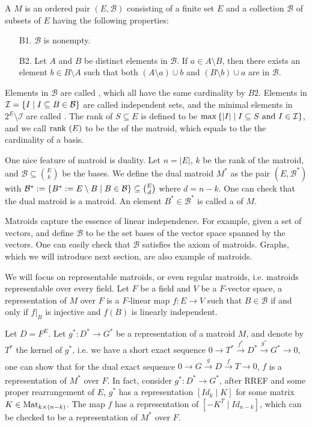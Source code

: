 \documentclass[b5paper]{article}
\newcommand{\II}{\mathcal{I}}
\newcommand{\BB}{\mathcal{B}}
\newcommand{\del}{\setminus}
\begin{document}
\begin{definition}[def:]{}
  A  $M$ is an ordered pair $(E,\BB)$ consisting of a finite set $E$ and a collection $\BB$ of subsets of $E$ having the following properties:
  \begin{enumerate}
    \item [B1.] $\BB$ is nonempty.
    \item [B2.] Let $A$ and $B$ be distinct elements in $\BB$. If $a\in A\del B$, then there exists an element $b\in B\del A$ such that both $(A\del a)\cup b$ and $(B\del b)\cup a$ are in $\BB$.
  \end{enumerate}
\end{definition}
Elements in $\BB$ are called , which all have the same cardinality by $B2$. Elements in $\II=\CB{I\mid I\subseteq B\in \BB}$ are called independent sets, and the minimal elements in $2^E\del \II$ are called . The rank of $S\subseteq E$ is defined to be $\max\CB{|I|\mid I\subseteq S\textnormal{ and }I\in \II}$, and we call $\textnormal{rank }(E)$ to be the  of the matroid, which equals to the the cardinality of a basis. 

One nice feature of matroid is duality. Let $n=|E|$, $k$ be the rank of the matroid, and $\BB\subseteq \binom{E}{k}$ be the bases. We define the dual matroid $M^*$ as the pair $(E,\BB^*)$ with $\BB^*:=\CB{B^*:=E\del B\mid B\in \BB}\subseteq \binom{E}{d}$ where $d=n-k$. One can check that the dual matroid is a matroid. An element $B^*\in \BB^*$ is called a  of $M$.

Matroids capture the essence of linear independence. For example, given a set of vectors, and define $\BB$ to be the set bases of the vector space spanned by the vectors. One can easily check that $\BB$ satisfies the axiom of matroids. Graphs, which we will introduce next section, are also example of matroids.

We will focus on representable matroids, or even regular matroids, i.e. matroids representable over every field.
Let $F$ be a field and $V$ be a $F$-vector space, a representation of $M$ over $F$ is a $F$-linear map $f:E\rightarrow V$ such that $B\in \BB$ if and only if $f|_B$ is injective and $f(B)$ is linearly independent.

Let $D=F^E$. Let $g^*:D^*\rightarrow G^*$ be a representation of a matroid $M$, and denote by $T^*$ the kernel of $g^*$, i.e. 
we have a short exact sequence $0\rightarrow T^*\xrightarrow[]{f^*}D^*\xrightarrow[]{g^*}G^*\rightarrow 0$, one can show that for the dual exact sequence $0\rightarrow G\xrightarrow[]{g} D\xrightarrow[]{f} T\rightarrow 0$, $f$ is a representation of $M^*$ over $F$.
In fact, consider $g^*:D^*\rightarrow G^*$, after RREF and some proper rearrangement of $E$, $g^*$ has a representation $[Id_k\mid K]$ for some matrix $K\in \textnormal{Mat}_{k\times (n-k)}$. The map $f$ has a representation of $[-K^T\mid Id_{n-k}]$, which can be checked to be a representation of $M^*$ over $F$.
\end{document}
